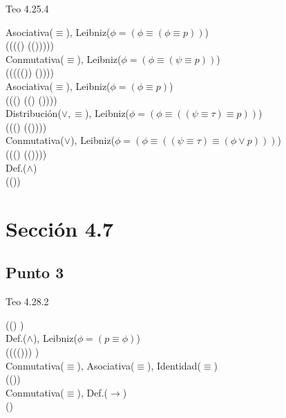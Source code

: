 \documentclass{article}
\begin{document}
\begin{logicenv}{Teo 4.25.4}
\begin{derivation}
        Asociativa($\equiv$), Leibniz($\phi = (\phi \equiv (\phi \equiv p))$)\\
            (\phi \equiv (\psi \equiv ((\phi \lor \psi) \equiv (\tau  \equiv (\phi \lor \psi)))))\\
        Conmutativa($\equiv$), Leibniz($\phi = (\phi \equiv (\psi \equiv p))$)\\
            (\phi \equiv (\psi \equiv ((\tau  \equiv (\phi \lor \psi)) \equiv (\phi \lor \psi))))\\
        Asociativa($\equiv$), Leibniz($\phi = (\phi \equiv p)$)\\
            (\phi \equiv ((\phi \equiv \tau) \equiv ((\phi \lor \tau) \equiv (\phi \lor \psi))))\\
        Distribución($\lor, \equiv$), Leibniz($\phi = (\phi \equiv ((\psi \equiv \tau)\equiv p))$)\\
            (\phi \equiv ((\psi \equiv \tau) \equiv (\phi \lor (\tau \equiv \psi))))\\
        Conmutativa($\lor$), Leibniz($\phi = (\phi \equiv ((\psi \equiv \tau) \equiv (\phi \lor p)))$)\\
            (\phi \equiv ((\psi \equiv \tau) \equiv (\phi \lor (\psi \equiv \tau))))\\
        Def.($\land$)\\
            (\phi \land (\psi \equiv \tau))
    \end{derivation}
\end{logicenv}


\section{Sección 4.7}
\subsection{Punto 3}
\begin{logicenv}{Teo 4.28.2}
    \begin{derivation}
            ((\phi \land \psi) \equiv \phi)\\
        Def.($\land$), Leibniz($\phi = (p \equiv \phi)$)\\
            ((\phi \equiv (\psi \equiv (\phi \lor \psi))) \equiv \phi)\\
        Conmutativa($\equiv$), Asociativa($\equiv$), Identidad($\equiv$)\\
            (\psi \equiv (\phi \lor \psi))\\
        Conmutativa($\equiv$), Def.($\to$)\\
            (\phi \to \psi)
    \end{derivation}
\end{logicenv}
\end{document}
